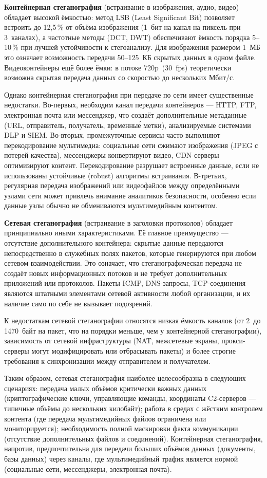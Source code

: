 \textbf{Контейнерная стеганография} (встраивание в изображения, аудио, видео) обладает высокой ёмкостью: метод LSB (Least Significant Bit) позволяет встроить до 12{,}5\,\% от объёма изображения (1~бит на канал на пиксель при 3~каналах), а частотные методы (DCT, DWT) обеспечивают ёмкость порядка 5--10\,\% при лучшей устойчивости к стегоанализу. Для изображения размером 1~МБ это означает возможность передачи 50--125~КБ скрытых данных в одном файле. Видеоконтейнеры ещё более ёмки: в потоке 720p~(30~fps) теоретически возможна скрытая передача данных со скоростью до нескольких Мбит/с.

Однако контейнерная стеганография при передаче по сети имеет существенные недостатки. Во-первых, необходим канал передачи контейнеров --- HTTP, FTP, электронная почта или мессенджер, что создаёт дополнительные метаданные (URL, отправитель, получатель, временны\'{е} метки), анализируемые системами DLP и SIEM. Во-вторых, промежуточные сервисы часто выполняют перекодирование мультимедиа: социальные сети сжимают изображения (JPEG с потерей качества), мессенджеры конвертируют видео, CDN-серверы оптимизируют контент. Перекодирование разрушает встроенные данные, если не использованы устойчивые (robust) алгоритмы встраивания. В-третьих, регулярная передача изображений или видеофайлов между определёнными узлами сети может привлечь внимание аналитиков безопасности, особенно если данные узлы обычно не обмениваются мультимедийным контентом.

\textbf{Сетевая стеганография} (встраивание в заголовки протоколов) обладает принципиально иными характеристиками. Её главное преимущество --- отсутствие дополнительного контейнера: скрытые данные передаются непосредственно в служебных полях пакетов, которые генерируются при любом сетевом взаимодействии. Это означает, что стеганографическая передача не создаёт новых информационных потоков и не требует дополнительных приложений или протоколов. Пакеты ICMP, DNS-запросы, TCP-соединения являются штатными элементами сетевой активности любой организации, и их наличие само по себе не вызывает подозрений.

К недостаткам сетевой стеганографии относятся низкая ёмкость каналов (от 2~до 1470~байт на пакет, что на порядки меньше, чем у контейнерной стеганографии), зависимость от сетевой инфраструктуры (NAT, межсетевые экраны, прокси-серверы могут модифицировать или отбрасывать пакеты) и более строгие требования к синхронизации между отправителем и получателем.

Таким образом, сетевая стеганография наиболее целесообразна в следующих сценариях: передача малых объёмов критически важных данных (криптографические ключи, управляющие команды, координаты C2-серверов --- типичные объёмы до нескольких килобайт); работа в средах с жёстким контролем контента (где передача мультимедийных файлов ограничена или мониторируется); необходимость полной маскировки факта коммуникации (отсутствие дополнительных файлов и соединений). Контейнерная стеганография, напротив, предпочтительна для передачи больших объёмов данных (документы, базы данных) через каналы, где мультимедийный трафик является нормой (социальные сети, мессенджеры, электронная почта).

